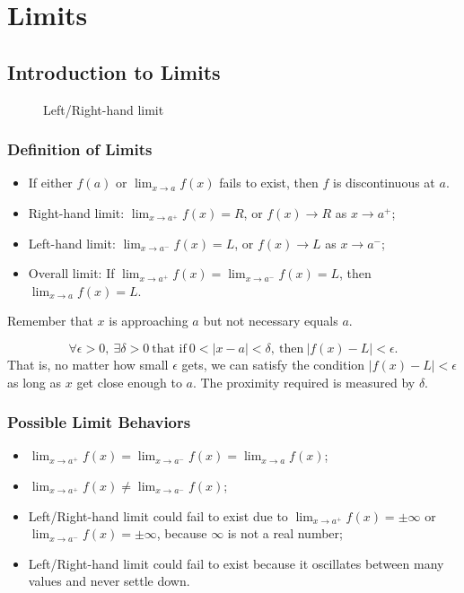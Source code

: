 \chapter{Limits}
\section{Introduction to Limits}
\begin{figure}[H]
  \centering
  \caption{Left/Right-hand limit}
\end{figure}

\subsection{Definition of Limits}
\begin{itemize}
\item If either $f(a)$ or $\lim_{x\to a} f(x)$ fails to exist, then $f$ is discontinuous at $a$.
\item Right-hand limit: $\lim_{x\to a^+}f(x)=R$, or $f(x)\to R$ as $x\to a^+$;
\item Left-hand limit: $\lim_{x\to a^-}f(x)=L$, or $f(x)\to L$ as $x\to a^-$;
\item Overall limit: If $\lim_{x\to a^+}f(x)=\lim_{x\to a^-}f(x)=L$, then $\lim_{x\to a}f(x)=L$.
\end{itemize}

\begin{note}Remember that $x$ is approaching $a$ but not necessary equals $a$.\end{note}
\begin{definition}
\[
\forall\epsilon>0,\ \exists\delta>0\ \text{that if}\ 0<\lvert x-a\rvert<\delta,\ \text{then}\ \lvert f(x)-L\rvert<\epsilon.
\]
That is, no matter how small $\epsilon$ gets, we can satisfy the condition $\lvert f(x)-L\rvert<\epsilon$ as long as $x$ get close enough to $a$. The proximity required is measured by $\delta$.
\end{definition}

\subsection{Possible Limit Behaviors}
\begin{itemize}
\item $\lim_{x\to a^+}f(x)=\lim_{x\to a^-}f(x)=\lim_{x\to a}f(x)$;
\item $\lim_{x\to a^+}f(x)\neq\lim_{x\to a^-}f(x)$;
\item Left\slash Right-hand limit could fail to exist due to $\lim_{x\to a^+}f(x)=\pm\infty$ or $\lim_{x\to a^-}f(x)=\pm\infty$, because $\infty$ is not a real number;
\item Left\slash Right-hand limit could fail to exist because it oscillates between many values and never settle down.
\end{itemize}

